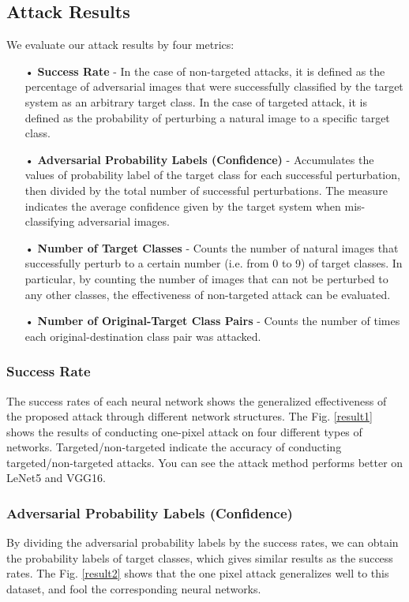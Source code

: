 \documentclass[runningheads]{llncs}
\begin{document}
\subsection{Attack Results}
We evaluate our attack results by four metrics\cite{su2019one}:
\begin{itemize}
\item[•] \textbf{Success Rate} - In the case of non-targeted attacks, it is defined as the percentage of adversarial images that were successfully classified by the target system as an arbitrary target class. In the case of targeted attack, it is defined as the probability of perturbing a natural image to a specific target class.
\item[•] \textbf{Adversarial Probability Labels (Confidence)} - Accumulates the values of probability label of the target class for each successful perturbation, then divided by the total number of successful perturbations. The measure indicates the average confidence given by the target system when mis-classifying adversarial images.
\item[•] \textbf{Number of Target Classes} - Counts the number of natural images that successfully perturb to a certain number (i.e. from 0 to 9) of target classes. In particular, by counting the number of images that can not be perturbed to any other classes, the effectiveness of non-targeted attack can be evaluated.
\item[•] \textbf{Number of Original-Target Class Pairs} - Counts the number of times each original-destination class pair was attacked.
\end{itemize}

\subsubsection{Success Rate} 
The success rates of each neural network shows the generalized effectiveness of the proposed attack through different network structures. The Fig. \ref{result1} shows the results of conducting one-pixel attack on four different types of networks. Targeted/non-targeted indicate the accuracy of conducting targeted/non-targeted attacks. You can see the attack method performs better on LeNet5 and VGG16.

\subsubsection{Adversarial Probability Labels (Confidence)} 
By dividing the adversarial probability labels by the success rates, we can obtain the probability labels of target classes, which gives similar results as the success rates. The Fig. \ref{result2} shows that the one pixel attack generalizes well to this dataset, and fool the corresponding neural networks.
\end{document}
